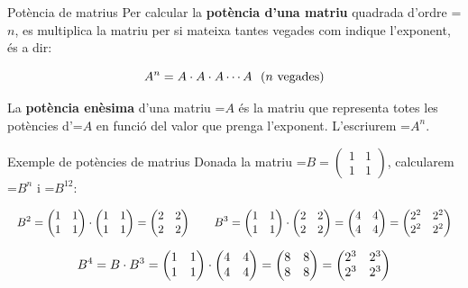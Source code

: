 \documentclass[11pt,a4paper]{article}
\newcommand{\fmm}[1]{\setbox0=\hbox{$#1$}\ifdim\wd0>\linewidth\fmdisp{#1}\else\mbox{\box0}\fi}
\newcommand{\fmdisp}[1]{\[\setbox2=\hbox{$\displaystyle #1$}\ifdim\wd2>\linewidth\resizebox{\linewidth}{!}{\box2}\else\box2\fi\]}
\begin{document}
\begin{fmdef}{Potència de matrius}
Per calcular la \textbf{potència d'una matriu} quadrada d'ordre \fmm{n}, es multiplica la matriu per si mateixa tantes vegades com indique l'exponent, és a dir:

\fmdisp{A^n=A\cdot A\cdot A\cdots A\ \ (n\ \text{vegades})}

La \textbf{potència enèsima} d'una matriu \fmm{A} és la matriu que representa totes les potències d'\fmm{A} en funció del valor que prenga l'exponent. L'escriurem \fmm{A^n}.
\end{fmdef}

\begin{fmex}{Exemple de potències de matrius}
Donada la matriu \fmm{B=\begin{pmatrix}1 & 1\\ 1 & 1\end{pmatrix}}, calcularem \fmm{B^n} i \fmm{B^{12}}:

\fmdisp{B^2=\begin{pmatrix}1 & 1\\ 1 & 1\end{pmatrix}\cdot\begin{pmatrix}1 & 1\\ 1 & 1\end{pmatrix}=\begin{pmatrix}2 & 2\\ 2 & 2\end{pmatrix}\qquad B^3=\begin{pmatrix}1 & 1\\ 1 & 1\end{pmatrix}\cdot\begin{pmatrix}2 & 2\\ 2 & 2\end{pmatrix}=\begin{pmatrix}4 & 4\\ 4 & 4\end{pmatrix}=\begin{pmatrix}2^2 & 2^2\\ 2^2 & 2^2\end{pmatrix}}

\fmdisp{B^4=B\cdot B^3=\begin{pmatrix}1 & 1\\ 1 & 1\end{pmatrix}\cdot\begin{pmatrix}4 & 4\\ 4 & 4\end{pmatrix}=\begin{pmatrix}8 & 8\\ 8 & 8\end{pmatrix}=\begin{pmatrix}2^3 & 2^3\\ 2^3 & 2^3\end{pmatrix}}


\end{fmex}
\end{document}

